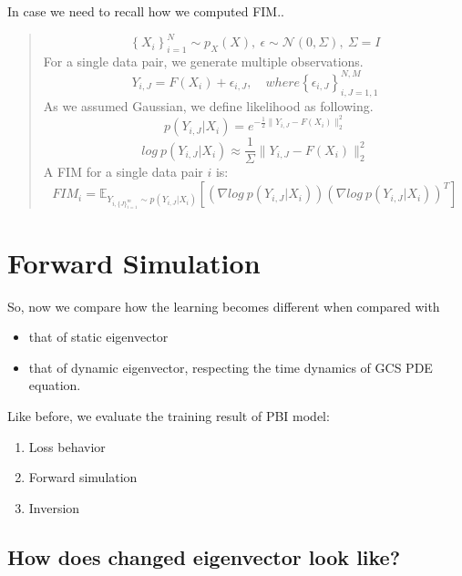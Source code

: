 \documentclass[
]{article}
\providecommand{\tightlist}{%
  \setlength{\itemsep}{0pt}\setlength{\parskip}{0pt}}\usepackage{longtable,booktabs,array}
\begin{document}
\hfill\break

In case we need to recall how we computed FIM..

\begin{quote}
\[ \left\{ X_i \right\}^N_{i=1} \sim p_X(X), \: \epsilon \sim \mathcal{N}(0, \Sigma), \: \Sigma = I
\] For a single data pair, we generate multiple observations.
\[Y_{i, J} = F(X_i) + \epsilon_{i, J}, \quad where \left\{ \epsilon_{i,J}\right\}^{N,M}_{i,J= 1,1}\]
As we assumed Gaussian, we define likelihood as following.
\[p(Y_{i,J}|X_i) = e^{-\frac{1}{2}\|Y_{i,J}-F(X_i)\|^2_2}\]
\[log \: p(Y_{i,J}|X_i) \approx \frac{1}{\Sigma}\|Y_{i,J}-F(X_i)\|^2_2\]
A FIM for a single data pair \(i\) is:
\[FIM_i = \mathbb{E}_{Y_{i, \{J\}^m_{i=1}} \sim p(Y_{i,J}|X_i)} \left[ \left(\nabla log \: p(Y_{i,J}|X_i)\right)\left(\nabla log \: p(Y_{i,J}|X_i)\right)^T\right]\]
\end{quote}

\section{Forward Simulation}\label{forward-simulation}

So, now we compare how the learning becomes different when compared with

\begin{itemize}
\tightlist
\item
  that of static eigenvector
\item
  that of dynamic eigenvector, respecting the time dynamics of GCS PDE
  equation.
\end{itemize}

Like before, we evaluate the training result of PBI model:

\begin{enumerate}
\def\labelenumi{\arabic{enumi}.}
\tightlist
\item
  Loss behavior
\item
  Forward simulation
\item
  Inversion
\end{enumerate}

\subsection{How does changed eigenvector look
like?}\label{how-does-changed-eigenvector-look-like}
\end{document}
